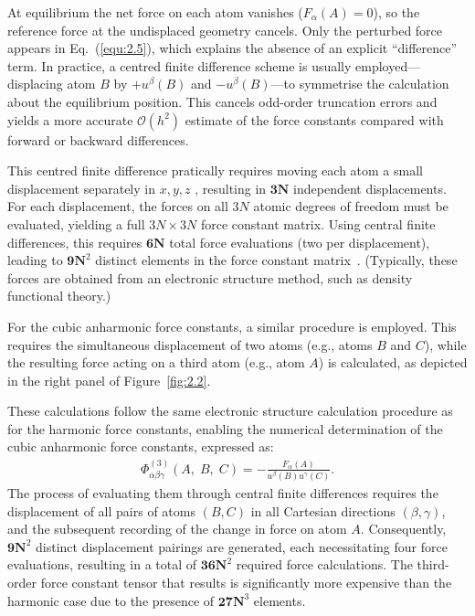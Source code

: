 At equilibrium the net force on each atom vanishes (\(F_\alpha(A)=0\)), so the reference force at the undisplaced geometry cancels.  
Only the perturbed force appears in Eq.~(\ref{equ:2.5}), which explains the absence of an explicit “difference” term.  
In practice, a centred finite difference scheme is usually employed—displacing atom $B$ by \(+\!u^\beta(B)\) and \(-\!u^\beta(B)\)—to symmetrise the calculation about the equilibrium position.  
This cancels odd-order truncation errors and yields a more accurate \(\mathcal{O}(h^2)\) estimate of the force constants compared with forward or backward differences.

This centred finite difference pratically requires moving each atom a small displacement separately in $x, y, z$ , resulting in $\textbf{3N}$ independent displacements. For each displacement, the forces on all $3N$ atomic degrees of freedom must be evaluated, yielding a full $3N \times 3N$ force constant matrix. Using central finite differences, this requires $\textbf{6N}$ total force evaluations (two per displacement), leading to $\textbf{9N}^2$ distinct elements in the force constant matrix~\cite{kittel2005}. (Typically, these forces are obtained from an electronic structure method, such as density functional theory.)

For the cubic anharmonic force constants, a similar procedure is employed. This requires the simultaneous displacement of two atoms (e.g., atoms $B$ and $C$), while the resulting force acting on a third atom (e.g., atom $A$) is calculated, as depicted in the right panel of Figure~\ref{fig:2.2}. 

These calculations follow the same electronic structure calculation procedure as for the harmonic force constants, enabling the numerical determination of the cubic anharmonic force constants, expressed as:
\begin{equation}
\label{equ:2.6}
\begin{split}
        \Phi^{(3)}_{\alpha\beta\gamma}(A,\;B,\;C) = -\frac{F_\alpha(A)}{u^\beta(B)u^\gamma(C)}.
\end{split}
\end{equation}
The process of evaluating them through central finite differences requires the displacement of all pairs of atoms \( (B, C) \) in all Cartesian directions \( (\beta, \gamma) \), and the subsequent recording of the change in force on atom \( A \). Consequently, \( \textbf{9N}^2 \) distinct displacement pairings are generated, each necessitating four force evaluations, resulting in a total of \( \textbf{36N}^2 \) required force calculations. The third-order force constant tensor that results is significantly more expensive than the harmonic case due to the presence of \( \textbf{27N}^3 \) elements.

